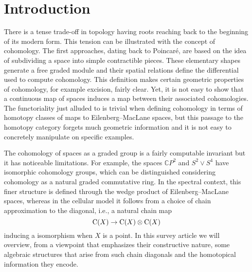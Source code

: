 
\section{Introduction} \label{s:introduction}

There is a tense trade-off in topology having roots reaching back to the beginning of its modern form.
This tension can be illustrated with the concept of cohomology.
The first approaches, dating back to Poincar\'e, are based on the idea of subdividing a space into simple contractible pieces.
These elementary shapes generate a free graded module and their spatial relations define the differential used to compute cohomology.
This definition makes certain geometric properties of cohomology, for example excision, fairly clear.
Yet, it is not easy to show that a continuous map of spaces induces a map between their associated cohomologies.
The functoriality just alluded to is trivial when defining cohomology in terms of homotopy classes of maps to Eilenberg--MacLane spaces, but this passage to the homotopy category forgets much geometric information and it is not easy to concretely manipulate on specific examples.

The cohomology of spaces as a graded group is a fairly computable invariant but it has noticeable limitations.
For example, the spaces $\mathbb{C} P^2$ and $S^2 \vee S^4$ have isomorphic cohomology groups, which can be distinguished considering cohomology as a natural graded commutative ring.
In the spectral context, this finer structure is defined through the wedge product of Eilenberg--MacLane spaces, whereas in the cellular model it follows from a choice of chain approximation to the diagonal, i.e., a natural chain map
\[
\operatorname{C}(X) \to \operatorname{C}(X) \otimes \operatorname{C}(X)
\]
inducing a isomorphism when $X$ is a point.
In this survey article we will overview, from a viewpoint that emphasizes their constructive nature, some algebraic structures that arise from such chain diagonals and the homotopical information they encode.

